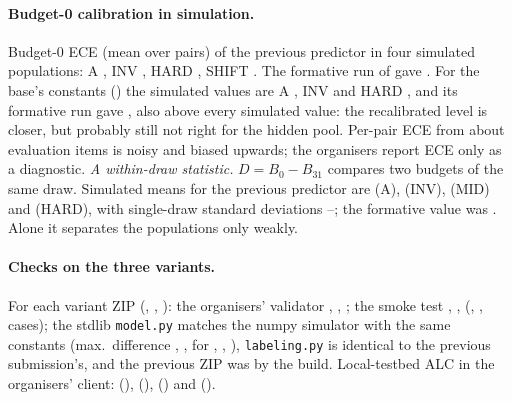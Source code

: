 \documentclass{article}
\begin{document}
\paragraph{Budget-0 calibration in simulation.} Budget-0 ECE (mean over pairs) of the previous predictor in four simulated populations: A \DdEceBZeroShipA, INV \DdEceBZeroShipInv, HARD \DdEceBZeroShipHard, SHIFT \DdEceBZeroShipShift. The formative run of \FmShipId{} gave \FmShipEceBZero. For the base's constants (\SelId) the simulated values are A \DdEceBZeroSelA, INV \DdEceBZeroSelInv{} and HARD \DdEceBZeroSelHard, and its formative run gave \FmSelEceBZero, also above every simulated value: the recalibrated level is closer, but probably still not right for the hidden pool. Per-pair ECE from about \FmSelItemsPerPair{} evaluation items is noisy and biased upwards; the organisers report ECE only as a diagnostic. \emph{A within-draw statistic.} $D=B_0-B_{31}$ compares two budgets of the same draw. Simulated means for the previous predictor are \DdDA{} (A), \DdDInv{} (INV), \DdDMid{} (MID) and \DdDHard{} (HARD), with single-draw standard deviations \DdDSdMin--\DdDSdMax; the formative value was \FmShipD. Alone it separates the populations only weakly.

\begin{table}[htbp]
\caption{Simulated populations (Table~\ref{tab:scenarios}) with all three variants: ALC and difference to the previous predictor, mean [95\% cluster-bootstrap CI over benchmarks]. Oracle: each pair's evaluation success rate as a constant. Source: \texttt{experiments/results/deep\_dive/proto\_level3.json}.}
\label{tab:scenariosfull}
\centering\footnotesize\setlength{\tabcolsep}{2.5pt}
\end{table}

\paragraph{Checks on the three variants.} For each variant ZIP (\SelId, \FmMhundId, \FmNosubjId): the organisers' validator \CkSelValidator, \CkMhundValidator, \CkNosubjValidator; the smoke test \CkSelSmokeOk, \CkMhundSmokeOk, \CkNosubjSmokeOk{} (\CkSelSmokeCases, \CkMhundSmokeCases, \CkNosubjSmokeCases{} cases); the stdlib \texttt{model.py} matches the numpy simulator with the same constants (max.\ difference \CkSelEquivMaxDiff, \CkMhundEquivMaxDiff, \CkNosubjEquivMaxDiff{} for \SelId{}, \FmMhundId{}, \FmNosubjId{}), \texttt{labeling.py} is identical to the previous submission's, and the previous ZIP was \CkSelShipZipUnchanged{} by the build. Local-testbed ALC in the organisers' client: \CkSelLoopAlc{} (\SelId{}), \CkMhundLoopAlc{} (\FmMhundId{}), \CkNosubjLoopAlc{} (\FmNosubjId{}) and \CkShipLoopAlc{} (\FmShipId{}).
\end{document}
